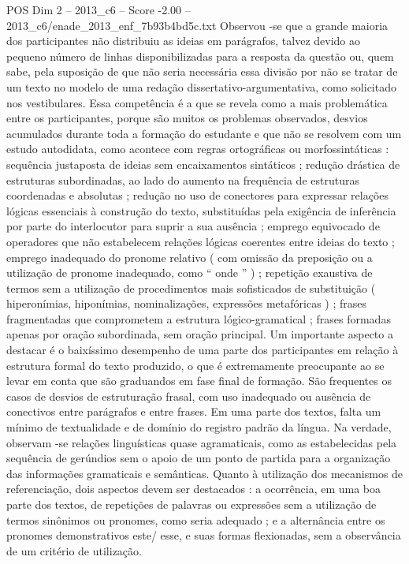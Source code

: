 \begin{textsample}{POS Dim 2 – 2013\_c6 – Score -2.00 – 2013\_c6/enade\_2013\_enf\_7b93b4bd5c.txt}
Observou -se que a grande maioria dos participantes não distribuiu as ideias em parágrafos, talvez devido ao pequeno número de linhas disponibilizadas para a resposta da questão ou, quem sabe, pela suposição de que não seria necessária essa divisão por não se tratar de um texto no modelo de uma redação dissertativo-argumentativa, como solicitado nos vestibulares.
Essa competência é a que se revela como a mais problemática entre os participantes, porque são muitos os problemas observados, desvios acumulados durante toda a formação do estudante e que não se resolvem com um estudo autodidata, como acontece com regras ortográficas ou morfossintáticas : sequência justaposta de ideias sem encaixamentos sintáticos ; redução drástica de estruturas subordinadas, ao lado do aumento na frequência de estruturas coordenadas e absolutas ; redução no uso de conectores para expressar relações lógicas essenciais à construção do texto, substituídas pela exigência de inferência por parte do interlocutor para suprir a sua ausência ; emprego equivocado de operadores que não estabelecem relações lógicas coerentes entre ideias do texto ; emprego inadequado do pronome relativo ( com omissão da preposição ou a utilização de pronome inadequado, como “ onde ” ) ; repetição exaustiva de termos sem a utilização de procedimentos mais sofisticados de substituição ( hiperonímias, hiponímias, nominalizações, expressões metafóricas ) ; frases fragmentadas que comprometem a estrutura lógico-gramatical ; frases formadas apenas por oração subordinada, sem oração principal.
Um importante aspecto a destacar é o baixíssimo desempenho de uma parte dos participantes em relação à estrutura formal do texto produzido, o que é extremamente preocupante ao se levar em conta que são graduandos em fase final de formação.
São frequentes os casos de desvios de estruturação frasal, com uso inadequado ou ausência de conectivos entre parágrafos e entre frases.
Em uma parte dos textos, falta um mínimo de textualidade e de domínio do registro padrão da língua.
Na verdade, observam -se relações linguísticas quase agramaticais, como as estabelecidas pela sequência de gerúndios sem o apoio de um ponto de partida para a organização das informações gramaticais e semânticas.
Quanto à utilização dos mecanismos de referenciação, dois aspectos devem ser destacados : a ocorrência, em uma boa parte dos textos, de repetições de palavras ou expressões sem a utilização de termos sinônimos ou pronomes, como seria adequado ; e a alternância entre os pronomes demonstrativos este/ esse, e suas formas flexionadas, sem a observância de um critério de utilização.

\end{textsample}
